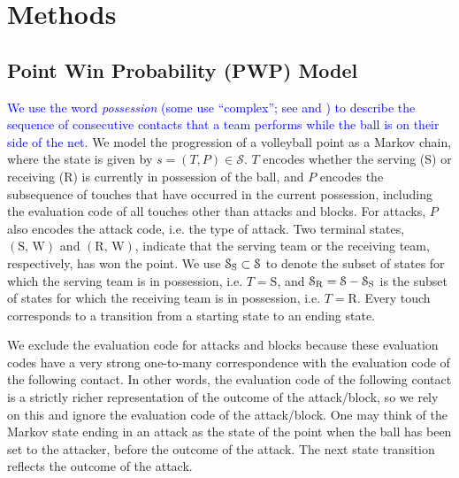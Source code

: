 \documentclass[USenglish]{article}
\theoremstyle{dgthm}
\theoremstyle{dgdef}
\begin{document}
\section{Methods}

\subsection{Point Win Probability (PWP) Model}
\label{sec:point-win-prob}

\textcolor{blue}{We use the word {\it possession} (some use ``complex''; see \textcite{hileno_etal_2020} and \textcite{laporta_etal_2015}) to describe the sequence of consecutive contacts that a team performs while the ball is on their side of the net.} We model the progression of a volleyball point as a Markov chain, where the state is given by $s = (T, P) \in \mathcal{S}$. $T$ encodes whether the serving (S) or receiving (R) is currently in possession of the ball, and $P$ encodes the subsequence of touches that have occurred in the current possession, including the evaluation code of all touches other than attacks and blocks. For attacks, $P$ also encodes the attack code, i.e. the type of attack. Two terminal states, $(\mbox{S, W})$ and $(\mbox{R, W})$, indicate that the serving team or the receiving team, respectively, has won the point. We use $\mathcal{S}_{\mbox{\scriptsize S}} \subset \mathcal{S}$ to denote the subset of states for which the serving team is in possession, i.e. $T = \mbox{S}$, and $\mathcal{S}_{\mbox{\scriptsize R}} = \mathcal{S} - \mathcal{S}_{\mbox{\scriptsize S}}$ is the subset of states for which the receiving team is in possession, i.e. $T = \mbox{R}$. Every touch corresponds to a transition from a starting state to an ending state.

We exclude the evaluation code for attacks and blocks because these evaluation codes have a very strong one-to-many correspondence with the evaluation code of the following contact. In other words, the evaluation code of the following contact is a strictly richer representation of the outcome of the attack/block, so we rely on this and ignore the evaluation code of the attack/block. One may think of the Markov state ending in an attack as the state of the point when the ball has been set to the attacker, before the outcome of the attack. The next state transition reflects the outcome of the attack.
\end{document}
